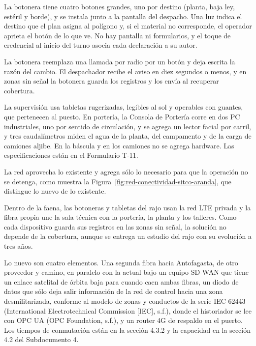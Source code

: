 \documentclass[subdoc]{../../comun/overfore}
\begin{document}
La botonera tiene cuatro botones grandes, uno por destino (planta, baja ley, estéril y borde), y se instala junto a la pantalla del despacho. Una luz indica el destino que el plan asigna al polígono y, si el material no corresponde, el operador aprieta el botón de lo que ve. No hay pantalla ni formularios, y el toque de credencial al inicio del turno asocia cada declaración a su autor.

La botonera reemplaza una llamada por radio por un botón y deja escrita la razón del cambio. El despachador recibe el aviso en diez segundos o menos, y en zonas sin señal la botonera guarda los registros y los envía al recuperar cobertura.

La supervisión usa tabletas rugerizadas, legibles al sol y operables con guantes, que pertenecen al puesto. En portería, la Consola de Portería corre en dos PC industriales, uno por sentido de circulación, y se agrega un lector facial por carril, y tres caudalímetros miden el agua de la planta, del campamento y de la carga de camiones aljibe. En la báscula y en los camiones no se agrega hardware. Las especificaciones están en el Formulario T-11.

La red aprovecha lo existente y agrega sólo lo necesario para que la operación no se detenga, como muestra la Figura~\ref{fig:red-conectividad-sitco-aranda}, que distingue lo nuevo de lo existente.

\begin{horizontal}
\end{horizontal}
Dentro de la faena, las botoneras y tabletas del rajo usan la red LTE privada y la fibra propia une la sala técnica con la portería, la planta y los talleres. Como cada dispositivo guarda sus registros en las zonas sin señal, la solución no depende de la cobertura, aunque se entrega un estudio del rajo con su evolución a tres años.

Lo nuevo son cuatro elementos. Una segunda fibra hacia Antofagasta, de otro proveedor y camino, en paralelo con la actual bajo un equipo SD-WAN que tiene un enlace satelital de órbita baja para cuando caen ambas fibras, un diodo de datos que sólo deja salir información de la red de control hacia una zona desmilitarizada, conforme al modelo de zonas y conductos de la serie IEC 62443 (International Electrotechnical Commission [IEC], s.f.), donde el historiador se lee con OPC UA (OPC Foundation, s.f.), y un router 4G de respaldo en el puerto. Los tiempos de conmutación están en la sección 4.3.2 y la capacidad en la sección 4.2 del Subdocumento 4.
\end{document}
